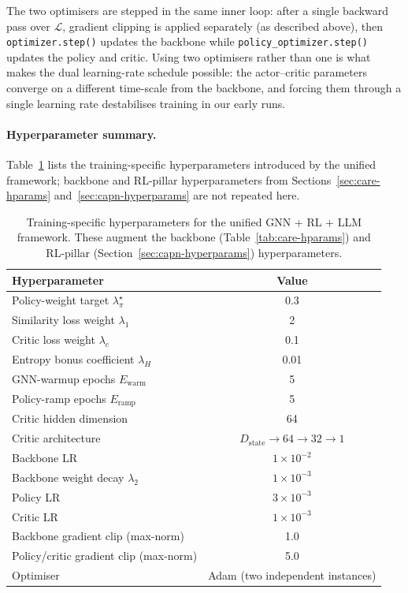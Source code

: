 The two optimisers are stepped in the same inner loop: after a single backward pass over $\mathcal{L}$, gradient clipping is applied separately (as described above), then \texttt{optimizer.step()} updates the backbone while \texttt{policy\_optimizer.step()} updates the policy and critic. Using two optimisers rather than one is what makes the dual learning-rate schedule possible: the actor--critic parameters converge on a different time-scale from the backbone, and forcing them through a single learning rate destabilises training in our early runs.

\paragraph{Hyperparameter summary.} Table~\ref{tab:unified-training-hparams} lists the training-specific hyperparameters introduced by the unified framework; backbone and RL-pillar hyperparameters from Sections~\ref{sec:care-hparams} and~\ref{sec:capn-hyperparams} are not repeated here.

\begin{table}[h!]
\centering
\begin{tabular}{|l|c|}
\hline
\textbf{Hyperparameter} & \textbf{Value} \\
\hline
Policy-weight target $\lambda_\pi^{\star}$          & 0.3 \\
Similarity loss weight $\lambda_1$                   & 2 \\
Critic loss weight $\lambda_c$                       & 0.1 \\
Entropy bonus coefficient $\lambda_H$                & 0.01 \\
GNN-warmup epochs $E_{\text{warm}}$                  & 5 \\
Policy-ramp epochs $E_{\text{ramp}}$                 & 5 \\
Critic hidden dimension                              & 64 \\
Critic architecture                                  & $D_{\text{state}} \to 64 \to 32 \to 1$ \\
Backbone LR                                          & $1 \times 10^{-2}$ \\
Backbone weight decay $\lambda_2$                    & $1 \times 10^{-3}$ \\
Policy LR                                            & $3 \times 10^{-3}$ \\
Critic LR                                            & $1 \times 10^{-3}$ \\
Backbone gradient clip (max-norm)                    & 1.0 \\
Policy/critic gradient clip (max-norm)               & 5.0 \\
Optimiser                                            & Adam (two independent instances) \\
\hline
\end{tabular}
\caption{Training-specific hyperparameters for the unified GNN + RL + LLM framework. These augment the backbone (Table~\ref{tab:care-hparams}) and RL-pillar (Section~\ref{sec:capn-hyperparams}) hyperparameters.}
\label{tab:unified-training-hparams}
\end{table}

